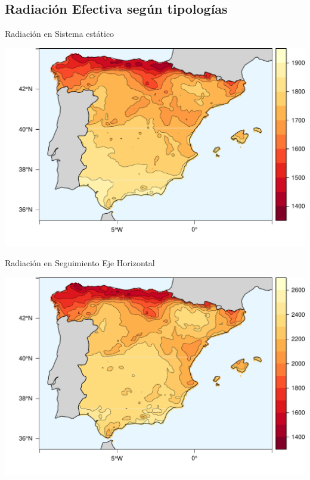 \documentclass[xcolor={usenames,svgnames,dvipsnames}]{beamer}
\begin{document}
\subsection{Radiación Efectiva según tipologías}
\label{sec:org8112c00}

\begin{frame}[label={sec:orga2983b0}]{Radiación en Sistema estático}
\begin{center}
\includegraphics[width=.9\linewidth]{../figs/FixedKrig.pdf}
\end{center}
\end{frame}



\begin{frame}[label={sec:orgf7bc246}]{Radiación en Seguimiento Eje Horizontal}
\begin{center}
\includegraphics[width=.9\linewidth]{../figs/HorizKrig.pdf}
\end{center}
\end{frame}
\end{document}
